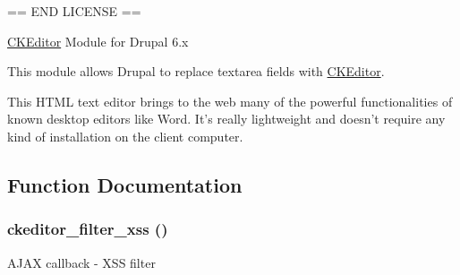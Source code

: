 == END LICENSE ==

\hyperlink{classCKEditor}{CKEditor} Module for Drupal 6.x

This module allows Drupal to replace textarea fields with \hyperlink{classCKEditor}{CKEditor}.

This HTML text editor brings to the web many of the powerful functionalities of known desktop editors like Word. It's really lightweight and doesn't require any kind of installation on the client computer. 

\subsection{Function Documentation}
\hypertarget{ckeditor_8page_8inc_08bc7bdbfbff2738fd935994c5fabdfb}{
\subsubsection[{ckeditor\_\-filter\_\-xss}]{\setlength{\rightskip}{0pt plus 5cm}ckeditor\_\-filter\_\-xss ()}}
\label{ckeditor_8page_8inc_08bc7bdbfbff2738fd935994c5fabdfb}


AJAX callback - XSS filter 